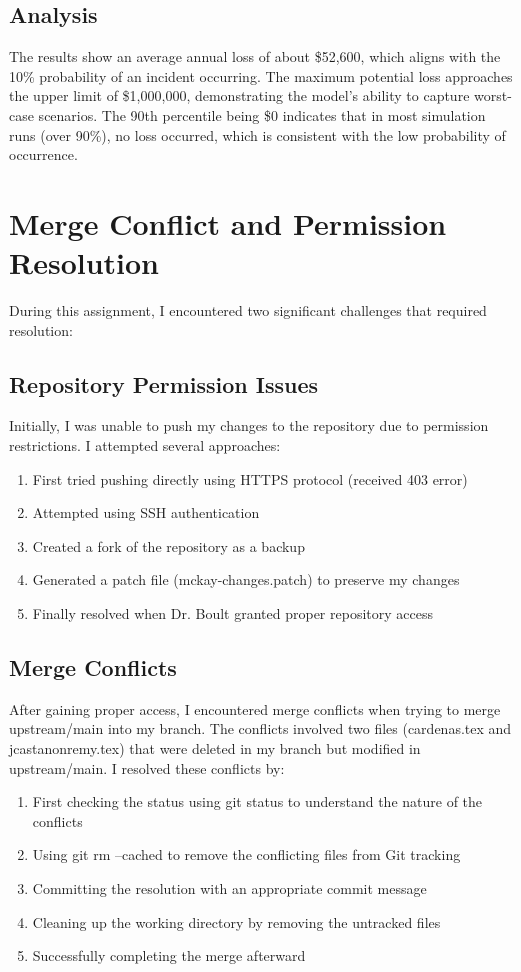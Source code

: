 \subsection{Analysis}
The results show an average annual loss of about \$52,600, which aligns with the 
10\% probability of an incident occurring. The maximum potential loss approaches 
the upper limit of \$1,000,000, demonstrating the model's ability to capture 
worst-case scenarios. The 90th percentile being \$0 indicates that in most 
simulation runs (over 90\%), no loss occurred, which is consistent with the 
low probability of occurrence.

\section{Merge Conflict and Permission Resolution}
During this assignment, I encountered two significant challenges that required resolution:

\subsection{Repository Permission Issues}
Initially, I was unable to push my changes to the repository due to permission restrictions. I attempted several approaches:
\begin{enumerate}
    \item First tried pushing directly using HTTPS protocol (received 403 error)
    \item Attempted using SSH authentication
    \item Created a fork of the repository as a backup
    \item Generated a patch file (mckay-changes.patch) to preserve my changes
    \item Finally resolved when Dr. Boult granted proper repository access
\end{enumerate}

\subsection{Merge Conflicts}
After gaining proper access, I encountered merge conflicts when trying to merge upstream/main into my branch. 
The conflicts involved two files (cardenas.tex and jcastanonremy.tex) that were deleted in my branch 
but modified in upstream/main. I resolved these conflicts by:
\begin{enumerate}
    \item First checking the status using git status to understand the nature of the conflicts
    \item Using git rm --cached to remove the conflicting files from Git tracking
    \item Committing the resolution with an appropriate commit message
    \item Cleaning up the working directory by removing the untracked files
    \item Successfully completing the merge afterward
\end{enumerate}

